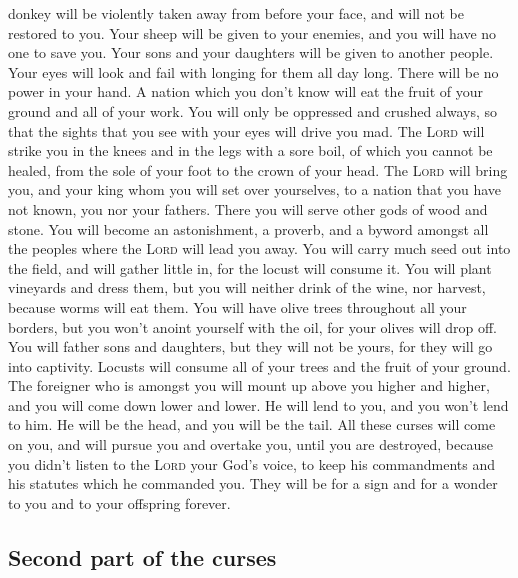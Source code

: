 donkey will be violently taken away from before your face, and will not
be restored to you. Your sheep will be given to your enemies, and you
will have no one to save you.  Your sons and your
daughters will be given to another people. Your eyes will look and fail
with longing for them all day long. There will be no power in your hand.
 A nation which you don't know will eat the fruit of your
ground and all of your work. You will only be oppressed and crushed
always,  so that the sights that you see with your eyes
will drive you mad.  The \textsc{Lord} will strike you in
the knees and in the legs with a sore boil, of which you cannot be
healed, from the sole of your foot to the crown of your head.
 The \textsc{Lord} will bring you, and your king whom you
will set over yourselves, to a nation that you have not known, you nor
your fathers. There you will serve other gods of wood and stone.
 You will become an astonishment, a proverb, and a byword
amongst all the peoples where the \textsc{Lord} will lead you away.
 You will carry much seed out into the field, and will
gather little in, for the locust will consume it.  You
will plant vineyards and dress them, but you will neither drink of the
wine, nor harvest, because worms will eat them.  You will
have olive trees throughout all your borders, but you won't anoint
yourself with the oil, for your olives will drop off. 
You will father sons and daughters, but they will not be yours, for they
will go into captivity.  Locusts will consume all of your
trees and the fruit of your ground.  The foreigner who is
amongst you will mount up above you higher and higher, and you will come
down lower and lower.  He will lend to you, and you won't
lend to him. He will be the head, and you will be the tail.
 All these curses will come on you, and will pursue you
and overtake you, until you are destroyed, because you didn't listen to
the \textsc{Lord} your God's voice, to keep his commandments and his
statutes which he commanded you.  They will be for a sign
and for a wonder to you and to your offspring forever.

\hypertarget{second-part-of-the-curses}{%
\subsection{Second part of the curses}\label{second-part-of-the-curses}}


